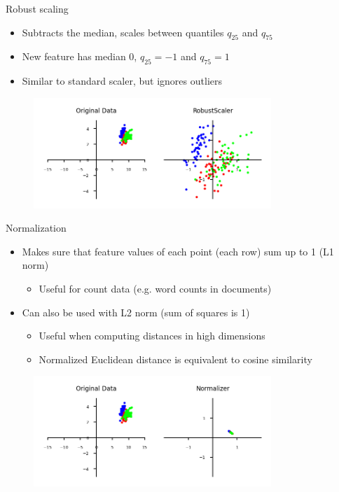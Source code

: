 \begin{frame}{Robust scaling}
    \begin{itemize}
        \item Subtracts the median, scales between quantiles $q_{25}$ and $q_{75}$
        \item New feature has median 0, $q_{25} = -1$ and $q_{75} = 1$
        \item Similar to standard scaler, but ignores outliers
    \end{itemize}

    \begin{figure}
        \centering
        \includegraphics[width=0.8\textwidth,keepaspectratio]{images/pre-processing/scaling_5.png}
    \end{figure}
\end{frame}


\begin{frame}{Normalization}
    \begin{itemize}
        \item Makes sure that feature values of each point (each row) sum up to 1 (L1 norm)
        \begin{itemize}
            \item Useful for count data (e.g. word counts in documents)
        \end{itemize}
        \item Can also be used with L2 norm (sum of squares is 1)
        \begin{itemize}
            \item Useful when computing distances in high dimensions
            \item Normalized Euclidean distance is equivalent to cosine similarity
        \end{itemize}
    \end{itemize}

    \begin{figure}
        \centering
        \includegraphics[width=0.8\textwidth,keepaspectratio]{images/pre-processing/scaling_6.png}
    \end{figure}
\end{frame}


